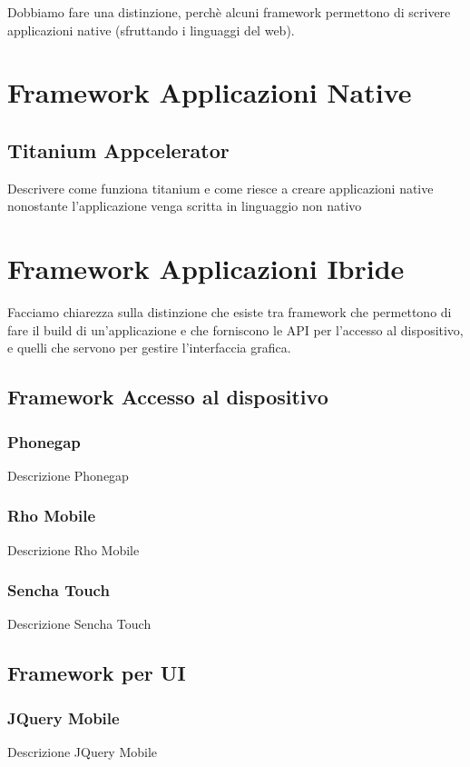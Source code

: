 	Dobbiamo fare una distinzione, perchè alcuni framework permettono di
	scrivere applicazioni native (sfruttando i linguaggi del web).
	
	\section{Framework Applicazioni Native}
	
		\subsection{Titanium Appcelerator}
			Descrivere come funziona titanium e come riesce a creare
			applicazioni native nonostante l'applicazione venga scritta in
			linguaggio non nativo
			
	\section{Framework Applicazioni Ibride}
		Facciamo chiarezza sulla distinzione che esiste tra framework che
		permettono di fare il build di un'applicazione e che forniscono le API
		per l'accesso al dispositivo, e quelli che servono per gestire
		l'interfaccia grafica.
	
		\subsection{Framework Accesso al dispositivo}
	
			\subsubsection{Phonegap}
				Descrizione Phonegap
	
			\subsubsection{Rho Mobile}
				Descrizione Rho Mobile
	
			\subsubsection{Sencha Touch}
				Descrizione Sencha Touch
	
			\subsection{Framework per UI}
	
				\subsubsection{JQuery Mobile}
					Descrizione JQuery Mobile
	
